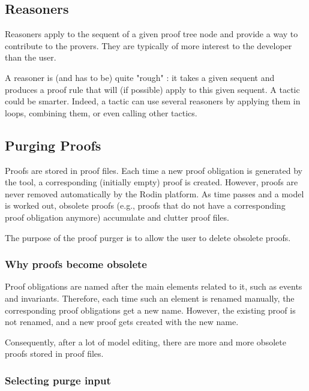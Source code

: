 \subsection{Reasoners}
\label{reasoners}

Reasoners apply to the sequent of a given proof tree node and provide a way to contribute to the provers.  They are typically of more interest to the developer than the user. 

A reasoner is (and has to be) quite "rough" : it takes a given sequent and produces a proof rule that will (if possible) apply to this given sequent. A tactic could be smarter. Indeed, a tactic can use several reasoners by applying them in loops, combining them, or even calling other tactics.

\subsection{Purging Proofs}
\label{purging_proofs}

Proofs are stored in proof files. Each time a new proof obligation is generated by the tool, a corresponding (initially empty) proof is created. However, proofs are never removed automatically by the Rodin platform. As time passes and a model is worked out, obsolete proofs (e.g., proofs that do not have a corresponding proof obligation anymore) accumulate and clutter proof files.

The purpose of the proof purger is to allow the user to delete obsolete proofs. 

\subsubsection{Why proofs become obsolete}

Proof obligations are named after the main elements related to it, such as events and invariants. Therefore, each time such an element is renamed manually, the corresponding proof obligations get a new name. However, the existing proof is not renamed, and a new proof gets created with the new name.

Consequently, after a lot of model editing, there are more and more obsolete proofs stored in proof files.

\subsubsection{Selecting purge input}

